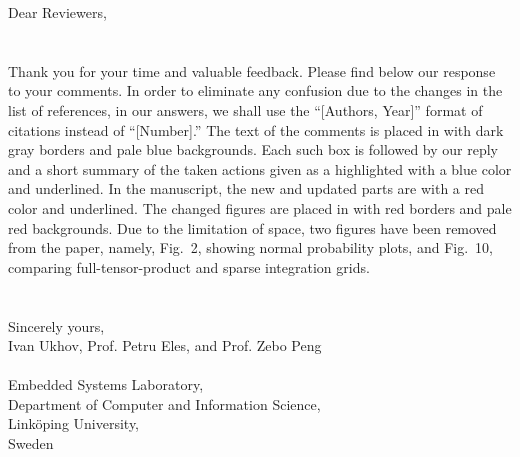 Dear Reviewers,
\\
\\
\\
\noindent Thank you for your time and valuable feedback.
Please find below our response to your comments.
In order to eliminate any confusion due to the changes in the list of references, in our answers, we shall use the ``[Authors, Year]'' format of citations instead of ``[Number].''
The text of the comments is placed in  with dark gray borders and pale blue backgrounds.
Each such box is followed by our reply and a short summary of the taken actions given as a  highlighted with a blue color and underlined.
In the manuscript, the new and updated parts are  with a red color and underlined.
The changed figures are placed in  with red borders and pale red backgrounds.
Due to the limitation of space, two figures have been removed from the paper, namely, Fig.~2, showing normal probability plots, and Fig.~10, comparing full-tensor-product and sparse integration grids.
\\
\\
\\
\noindent Sincerely yours,\\
Ivan Ukhov, Prof. Petru Eles, and Prof. Zebo Peng
\\
\\
\noindent Embedded Systems Laboratory,\\
Department of Computer and Information Science,\\
Link\"{o}ping University,\\
Sweden
